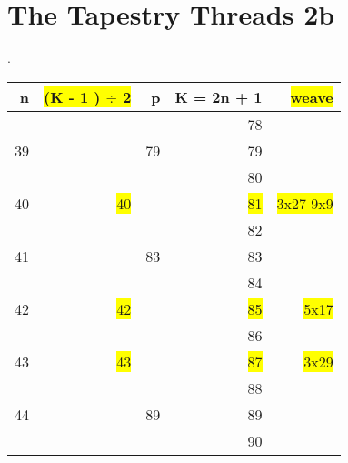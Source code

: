 \section{The Tapestry Threads 2b}
\tiny
.
\\
\begin{tabular}{|r|r|r|r|r|}
    \hline      n &          \colorbox{yellow}{(K - 1 ) $\div$ 2}     &                p  &  K = 2n + 1  & \colorbox{yellow}{weave  }     \\
  \hline                              &                        &         &     78    &                                \\
  \hline               39             &                        &     79  &     79    &                                \\
    \hline                              &                        &         &     80    &                                \\
    \hline               40             &   \colorbox{yellow}{40}&         &     \colorbox{yellow}{81}    &    \colorbox{yellow}{3x27 9x9 }\\
    \hline                              &                        &         &     82    &                                \\
    \hline               41             &                        &     83  &     83    &                                \\
    \hline                              &                        &         &     84    &                                \\
    \hline               42             &   \colorbox{yellow}{42}&         &     \colorbox{yellow}{85}    &     \colorbox{yellow}{5x17  }  \\
    \hline                              &                        &         &     86    &                                \\
    \hline               43             &   \colorbox{yellow}{43}&         &     \colorbox{yellow}{87}    &     \colorbox{yellow}{3x29  }  \\
    \hline                              &                        &         &     88    &                                \\
    \hline               44             &                        &     89  &     89    &                                \\
    \hline                              &                        &         &     90    &                                \\

\end{tabular}
